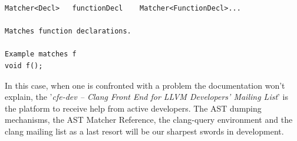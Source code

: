 \begin{lstlisting}[numbers=none, frame=none, name={AST Matcher Reference documentation for the matcher functionDecl()}]
Matcher<Decl>	functionDecl	Matcher<FunctionDecl>...

Matches function declarations.

Example matches f
void f();
\end{lstlisting}
In this case, when one is confronted with a problem the documentation won't explain, the '\textit{cfe-dev -- Clang Front End for LLVM Developers' Mailing List}' is the platform to receive help from active developers. The AST dumping mechanisms, the AST Matcher Reference, the clang-query environment and the clang mailing list as a last resort will be our sharpest swords in development.





